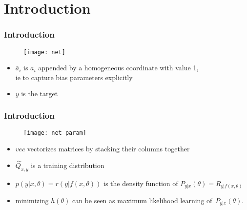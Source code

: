 \section{Introduction}

\begin{frame}
\frametitle{Introduction}

\begin{figure}
    \centering
    \texttt{[image: net]}
\end{figure}

{\footnotesize
\begin{itemize}
    \item $\bar{a}_i$ is $a_i$ appended by a homogeneous coordinate with value 1, \\
        ie to capture bias parameters explicitly
    \item $y$ is the target
\end{itemize}
}
\end{frame}

\begin{frame}
\frametitle{Introduction}

\begin{figure}
    \centering
    \texttt{[image: net\_param]}
\end{figure}

{\footnotesize
\begin{itemize}
    \item $vec$ vectorizes matrices by stacking their columns together
    \item $\hat{Q}_{x, y}$ is a training distribution
    \item $p(y|x, \theta) = r(y|f(x, \theta))$ is the density function of $P_{y|x}(\theta) = R_{y|f(x,\theta)}$
    \item minimizing $h(\theta)$ can be seen as maximum likelihood learning of~$P_{y|x}(\theta)$.
\end{itemize}
}

\end{frame}

